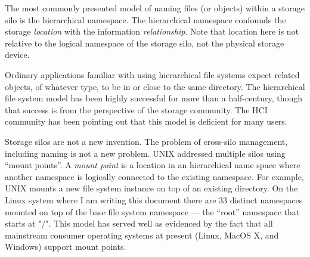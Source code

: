 The most commonly presented model of naming files (or objects) within a storage
silo is the hierarchical namespace.  The hierarchical namespace confounds the
storage \emph{location} with the information \emph{relationship}.  Note that
location here is not relative to the logical namespace of the storage silo, not
the physical storage device.


Ordinary applications familiar with using hierarchical file systems expect
related objects, of whatever type, to be in or close to the same directory.  The
hierarchical file system model has been highly successful for more than a
half-century, though that success is from the perspective of the storage
community.  The \ac{HCI} community has been pointing out that this model is
deficient for many users.

Storage silos are not a new invention.  The problem of cross-silo management,
including naming is not a new problem.  UNIX addressed multiple silos using
``mount points''.  A \emph{mount point} is a location in an hierarchical name
space where another namespace is logically connected to the existing namespace.
For example, UNIX mounts a new file system instance on top of an existing
directory.  On the Linux system where I am writing this document there are 33
distinct namespaces mounted on top of the base file system namespace --- the
``root'' namespace that starts at "/".  This model has served well as evidenced
by the fact that all mainstream consumer operating systems at present (Linux,
MacOS X, and Windows) support mount points.

